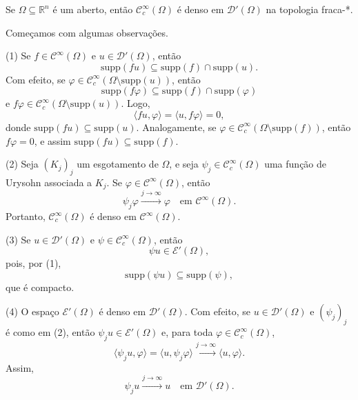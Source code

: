 \documentclass[../distribution_theory_notes.tex]{subfiles}
\begin{document}
\begin{theorem*}
	Se \(\Omega \subseteq \mathbb{R}^{n}\) é um aberto, então \(\mathcal{C}_{c}^{\infty}(\Omega )\) é denso em \(\mathcal{D}'(\Omega )\) na topologia fraca-*.
\end{theorem*}
\begin{proof*}
	Começamos com algumas observações.

	(1) Se \(f\in \mathcal{C}^{\infty}(\Omega )\) e \(u\in \mathcal{D}'(\Omega )\), então
	\[
		\mathrm{supp}(fu)\subseteq \mathrm{supp}(f)\cap \mathrm{supp}(u).
	\]
	Com efeito, se \(\varphi \in \mathcal{C}_{c}^{\infty}(\Omega \setminus{\mathrm{supp}(u)})\), então
	\[
		\mathrm{supp}(f\varphi )\subseteq \mathrm{supp}(f)\cap \mathrm{supp}(\varphi )
	\]
	e \(f\varphi \in \mathcal{C}_{c}^{\infty}(\Omega \setminus{\mathrm{supp}(u)})\). Logo,
	\[
		\langle fu, \varphi  \rangle=\langle u, f\varphi  \rangle=0,
	\]
	donde \(\mathrm{supp}(fu)\subseteq \mathrm{supp}(u)\). Analogamente, se \(\varphi \in \mathcal{C}_{c}^{\infty}(\Omega \setminus{\mathrm{supp}(f)})\), então \(f\varphi =0\), e assim \(\mathrm{supp}(fu)\subseteq \mathrm{supp}(f)\).

	(2) Seja \((K_{j})_{j}\) um esgotamento de \(\Omega \), e seja \(\psi_{j}\in \mathcal{C}_{c}^{\infty}(\Omega )\) uma função de Urysohn associada a \(K_{j}\). Se \(\varphi \in \mathcal{C}^{\infty}(\Omega )\), então
	\[
		\psi_{j}\varphi \stackrel{j\to \infty}\longrightarrow \varphi \quad \text{em }\mathcal{C}^{\infty}(\Omega ).
	\]
	Portanto, \(\mathcal{C}_{c}^{\infty}(\Omega )\) é denso em \(\mathcal{C}^{\infty}(\Omega )\).

	(3) Se \(u\in \mathcal{D}'(\Omega )\) e \(\psi \in \mathcal{C}_{c}^{\infty}(\Omega )\), então
	\[
		\psi u\in \mathcal{E}'(\Omega ),
	\]
	pois, por (1),
	\[
		\mathrm{supp}(\psi u)\subseteq \mathrm{supp}(\psi ),
	\]
	que é compacto.

	(4) O espaço \(\mathcal{E}'(\Omega )\) é denso em \(\mathcal{D}'(\Omega )\). Com efeito, se \(u\in \mathcal{D}'(\Omega )\) e \((\psi_{j})_{j}\) é como em (2), então \(\psi_{j}u\in \mathcal{E}'(\Omega )\) e, para toda \(\varphi \in \mathcal{C}_{c}^{\infty}(\Omega )\),
	\[
		\langle \psi_{j}u, \varphi  \rangle
		=\langle u, \psi_{j}\varphi  \rangle
		\stackrel{j\to \infty}\longrightarrow \langle u, \varphi  \rangle.
	\]
	Assim,
	\[
		\psi_{j}u\stackrel{j\to \infty}\longrightarrow u\quad \text{em }\mathcal{D}'(\Omega ).
	\]


\end{proof*}
\end{document}
